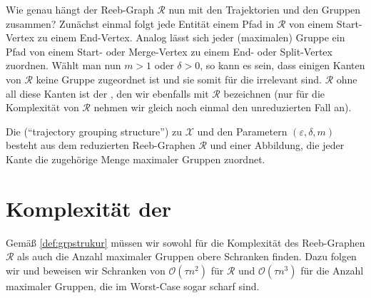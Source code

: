 Wie genau hängt der Reeb-Graph $\mathcal{R}$ nun mit den Trajektorien und den Gruppen zusammen? 
Zunächst einmal folgt jede Entität einem Pfad in $\mathcal{R}$ von einem Start-Vertex zu einem End-Vertex.
Analog lässt sich jeder (maximalen) Gruppe ein Pfad von einem Start- oder Merge-Vertex zu einem End- oder Split-Vertex zuordnen.
Wählt man nun $m > 1$ oder $\delta > 0$, so kann es sein, dass einigen Kanten von $\mathcal{R}$ keine Gruppe zugeordnet ist und sie somit für die \GrpStruktur irrelevant sind.
$\mathcal{R}$ ohne all diese Kanten ist der , den wir ebenfalls mit $\mathcal{R}$ bezeichnen (nur für die Komplexität von $\mathcal{R}$ nehmen wir gleich noch einmal den unreduzierten Fall an).


\begin{definition}[{name=[{\GrpStruktur}]},label=def:grpstrukur]
	Die \Index{\GrpStruktur} (\enquote{trajectory grouping structure}) zu $\mathcal{X}$ und den Parametern $(\varepsilon,\delta,m)$ besteht aus dem reduzierten Reeb-Graphen $\mathcal{R}$ und einer Abbildung, die jeder Kante die zugehörige Menge maximaler Gruppen zuordnet.
\end{definition}

\section{Komplexität der \GrpStruktur} %
\label{sec:komplex}
Gemäß \cref{def:grpstrukur} müssen wir sowohl für die Komplexität des Reeb-Graphen $\mathcal{R}$ als auch die Anzahl maximaler Gruppen obere Schranken finden.
Dazu folgen wir \textcite[Sec.~2.1~\&~2.2]{buchin2015} und beweisen wir Schranken von $\mathcal{O}(\tau n^2)$ für $\mathcal{R}$ und $\mathcal{O}(\tau n^3)$ für die Anzahl maximaler Gruppen, die im Worst-Case sogar scharf sind. 

